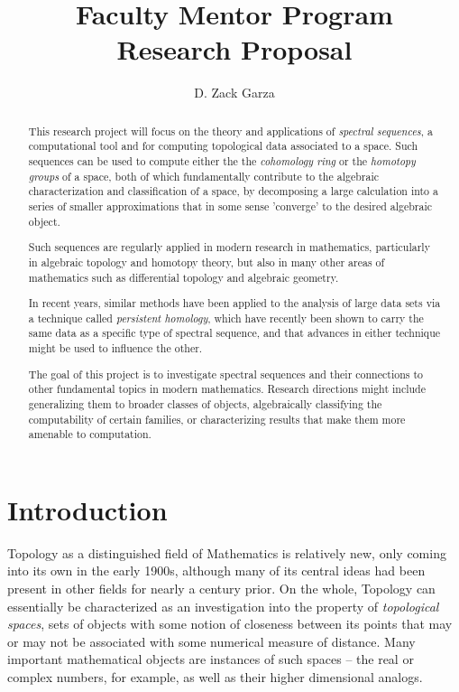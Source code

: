 \documentclass[normal]{aomart}
\title[Research Proposal]{Faculty Mentor Program \\ Research Proposal}
\author{D. Zack Garza}
\newtheorem[{}\it]{thm}{Theorem}[section]
\theoremstyle{definition}
\newtheorem*[{}\it]{notation}{Notation}
\begin{document}
\begin{abstract}
  This research project will focus on the theory and applications of \textit{spectral sequences}, a computational tool and for computing topological data associated to a space. Such sequences can be used to compute either the the \textit{cohomology ring} or the \textit{homotopy groups} of a space, both of which fundamentally contribute to the algebraic characterization and classification of a space, by decomposing a large calculation into a series of smaller approximations that in some sense 'converge' to the desired algebraic object.
  
  Such sequences are regularly applied in modern research in mathematics, particularly in algebraic topology and homotopy theory, but also in many other areas of mathematics such as differential topology and algebraic geometry.
  
  In recent years, similar methods have been applied to the analysis of large data sets via a technique called \textit{persistent homology}, which have recently been shown to carry the same data as a specific type of spectral sequence, and that advances in either technique might be used to influence the other.\cite{Basu2017}
  
  The goal of this project is to investigate spectral sequences and their connections to other fundamental topics in modern mathematics. Research directions might include generalizing them to broader classes of objects, algebraically classifying the computability of certain families, or characterizing results that make them more amenable to computation.
\end{abstract}

\maketitle
\tableofcontents
\newpage

\section{Introduction}

Topology as a distinguished field of Mathematics is relatively new, only coming into its own in the early 1900s, although many of its central ideas had been present in other fields for nearly a century prior. On the whole, Topology can essentially be characterized as an investigation into the property of \textit{topological spaces}, sets of objects with some notion of closeness between its points that may or may not be associated with some numerical measure of distance. Many important mathematical objects are instances of such spaces -- the real or complex numbers, for example, as well as their higher dimensional analogs.
\end{document}
